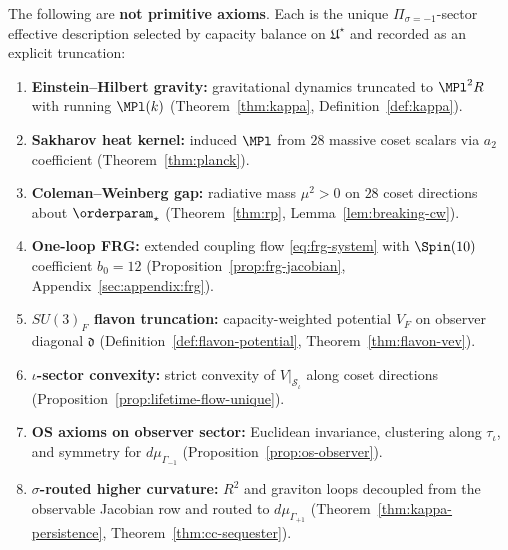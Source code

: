\begin{definition}\label{def:assumption-ledger}
The following are \textbf{not primitive axioms}. Each is the unique
$\Pi_{\sigma=-1}$-sector effective description selected by capacity balance
on $\mathfrak{U}^\star$ and recorded as an explicit truncation:
\begin{enumerate}[label=\textbf{A\arabic*},leftmargin=*]
  \item \label{asm:eh} \textbf{Einstein--Hilbert gravity:} gravitational
    dynamics truncated to $\MPl^2 R$ with running $\MPl(k)$
    (Theorem~\ref{thm:kappa}, Definition~\ref{def:kappa}).
  \item \label{asm:sakharov} \textbf{Sakharov heat kernel:} induced $\MPl$ from
    $28$ massive coset scalars via $a_2$ coefficient
    (Theorem~\ref{thm:planck}).
  \item \label{asm:cw} \textbf{Coleman--Weinberg gap:} radiative mass $\mu^2>0$
    on $28$ coset directions about $\orderparam_\star$
    (Theorem~\ref{thm:rp}, Lemma~\ref{lem:breaking-cw}).
  \item \label{asm:frg} \textbf{One-loop FRG:} extended coupling flow
    \eqref{eq:frg-system} with $\Spin(10)$ coefficient $b_0=12$
    (Proposition~\ref{prop:frg-jacobian}, Appendix~\ref{sec:appendix:frg}).
  \item \label{asm:flavon} \textbf{$SU(3)_F$ flavon truncation:} capacity-weighted
    potential $V_F$ on observer diagonal $\mathfrak{d}$
    (Definition~\ref{def:flavon-potential}, Theorem~\ref{thm:flavon-vev}).
  \item \label{asm:convex} \textbf{$\iota$-sector convexity:} strict convexity of
    $V|_{\mathcal{S}_\iota}$ along coset directions
    (Proposition~\ref{prop:lifetime-flow-unique}).
  \item \label{asm:os} \textbf{OS axioms on observer sector:} Euclidean
    invariance, clustering along $\tau_\iota$, and symmetry for
    $d\mu_{\Gamma_{-1}}$ (Proposition~\ref{prop:os-observer}).
  \item \label{asm:grav-loops} \textbf{$\sigma$-routed higher curvature:}
    $R^2$ and graviton loops decoupled from the observable Jacobian row and
    routed to $d\mu_{\Gamma_{+1}}$
    (Theorem~\ref{thm:kappa-persistence}, Theorem~\ref{thm:cc-sequester}).
\end{enumerate}
\end{definition}

